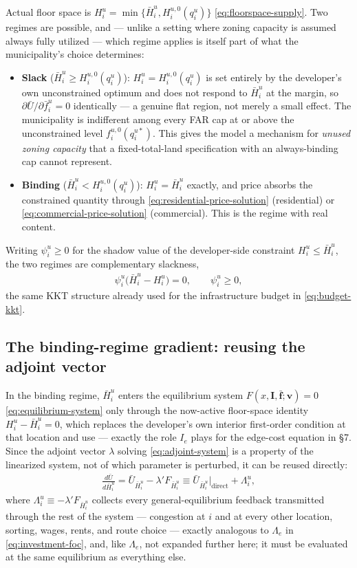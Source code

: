 \documentclass[12pt,a4paper]{article}
\newcommand{\1}{\mathbb 1}
\begin{document}
Actual floor space is $H_i^u=\min\{\bar H_i^u, H_i^{u,0}(q_i^u)\}$ \eqref{eq:floorspace-supply}. Two regimes are possible, and — unlike a setting where zoning capacity is assumed always fully utilized — which regime applies is itself part of what the municipality's choice determines:
\begin{itemize}
\item \textbf{Slack} ($\bar H_i^u\geq H_i^{u,0}(q_i^u)$): $H_i^u=H_i^{u,0}(q_i^u)$ is set entirely by the developer's own unconstrained optimum and does not respond to $\bar H_i^u$ at the margin, so $\partial \bar U/\partial \bar f_i^u=0$ identically — a genuine flat region, not merely a small effect. The municipality is indifferent among every FAR cap at or above the unconstrained level $f_i^{u,0}(q_i^{u*})$. This gives the model a mechanism for \emph{unused zoning capacity} that a fixed-total-land specification with an always-binding cap cannot represent.
\item \textbf{Binding} ($\bar H_i^u<H_i^{u,0}(q_i^u)$): $H_i^u=\bar H_i^u$ exactly, and price absorbs the constrained quantity through \eqref{eq:residential-price-solution} (residential) or \eqref{eq:commercial-price-solution} (commercial). This is the regime with real content.
\end{itemize}
Writing $\psi_i^u\geq0$ for the shadow value of the developer-side constraint $H_i^u\leq\bar H_i^u$, the two regimes are complementary slackness,
\begin{align}
\psi_i^u\bigl(\bar H_i^u-H_i^u\bigr)=0,\qquad \psi_i^u\geq0,
\label{eq:far-slackness}
\end{align}
the same KKT structure already used for the infrastructure budget in \eqref{eq:budget-kkt}.

\subsection{The binding-regime gradient: reusing the adjoint vector}

In the binding regime, $\bar H_i^u$ enters the equilibrium system $F(x,\mathbf I,\bar{\mathbf f};\mathbf v)=0$ \eqref{eq:equilibrium-system} only through the now-active floor-space identity $H_i^u-\bar H_i^u=0$, which replaces the developer's own interior first-order condition at that location and use — exactly the role $I_e$ plays for the edge-cost equation in \S7. Since the adjoint vector $\lambda$ solving \eqref{eq:adjoint-system} is a property of the linearized system, not of which parameter is perturbed, it can be reused directly:
\begin{align}
\frac{d\bar U}{d\bar H_i^u}
=
\bar U_{\bar H_i^u}-\lambda'F_{\bar H_i^u}
\equiv
\bar U_{\bar H_i^u}\Big|_{\text{direct}}+\Lambda_i^u,
\label{eq:far-gradient}
\end{align}
where $\Lambda_i^u\equiv-\lambda'F_{\bar H_i^u}$ collects every general-equilibrium feedback transmitted through the rest of the system — congestion at $i$ and at every other location, sorting, wages, rents, and route choice — exactly analogous to $\Lambda_e$ in \eqref{eq:investment-foc}, and, like $\Lambda_e$, not expanded further here; it must be evaluated at the same equilibrium as everything else.
\end{document}

